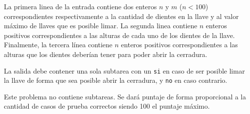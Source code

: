 \documentclass{oci}
\begin{document}
\begin{inputDescription}
La primera linea de la entrada contiene dos enteros $n$ y $m$ ($n<100$) correspondientes
respectivamente a la cantidad de dientes en la llave y al valor máximo de llaves
que es posible limar.
La segunda linea contiene $n$ enteros positivos correspondientes a las alturas de cada uno
de los dientes de la llave.
Finalmente, la tercera línea contiene $n$ enteros positivos correspondientes a las alturas que los
dientes deberían tener para poder abrir la cerradura.
\end{inputDescription}

\begin{outputDescription}
La salida debe contener una sola subtarea con un \verb|si| en caso de ser posible
limar la llave de forma que sea posible abrir la cerradura, y \verb|no| en caso contrario.
\end{outputDescription}

\begin{scoreDescription}
  Este problema no contiene subtareas.
  Se dará puntaje de forma proporcional a la cantidad de casos de prueba correctos siendo
  100 el puntaje máximo.
\end{scoreDescription}

\begin{sampleDescription}
\end{sampleDescription}
\end{document}
